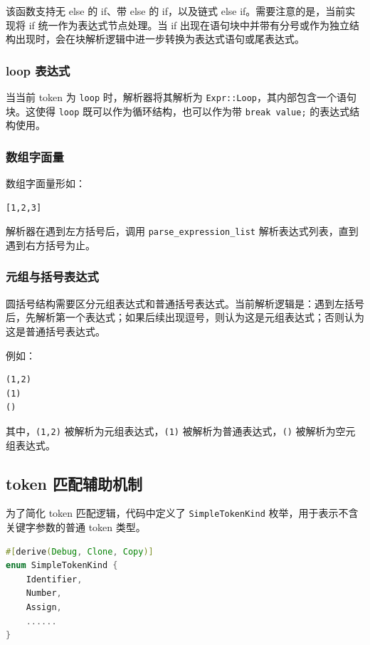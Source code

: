 \documentclass[UTF8,a4paper,12pt]{ctexart}
\begin{document}
该函数支持无 else 的 if、带 else 的 if，以及链式 else if。需要注意的是，当前实现将 if 统一作为表达式节点处理。当 if 出现在语句块中并带有分号或作为独立结构出现时，会在块解析逻辑中进一步转换为表达式语句或尾表达式。

\subsubsection{loop 表达式}

当当前 token 为 \texttt{loop} 时，解析器将其解析为 \texttt{Expr::Loop}，其内部包含一个语句块。这使得 \texttt{loop} 既可以作为循环结构，也可以作为带 \texttt{break value;} 的表达式结构使用。

\subsubsection{数组字面量}

数组字面量形如：

\begin{lstlisting}[caption={数组字面量示例}]
[1,2,3]
\end{lstlisting}

解析器在遇到左方括号后，调用 \texttt{parse\_expression\_list} 解析表达式列表，直到遇到右方括号为止。

\subsubsection{元组与括号表达式}

圆括号结构需要区分元组表达式和普通括号表达式。当前解析逻辑是：遇到左括号后，先解析第一个表达式；如果后续出现逗号，则认为这是元组表达式；否则认为这是普通括号表达式。

例如：

\begin{lstlisting}[caption={元组表达式与括号表达式示例}]
(1,2)
(1)
()
\end{lstlisting}

其中，\texttt{(1,2)} 被解析为元组表达式，\texttt{(1)} 被解析为普通表达式，\texttt{()} 被解析为空元组表达式。

\subsection{token 匹配辅助机制}

为了简化 token 匹配逻辑，代码中定义了 \texttt{SimpleTokenKind} 枚举，用于表示不含关键字参数的普通 token 类型。

\begin{lstlisting}[language=Rust,caption={SimpleTokenKind 枚举}]
#[derive(Debug, Clone, Copy)]
enum SimpleTokenKind {
    Identifier,
    Number,
    Assign,
    ......
}
\end{lstlisting}
\end{document}
